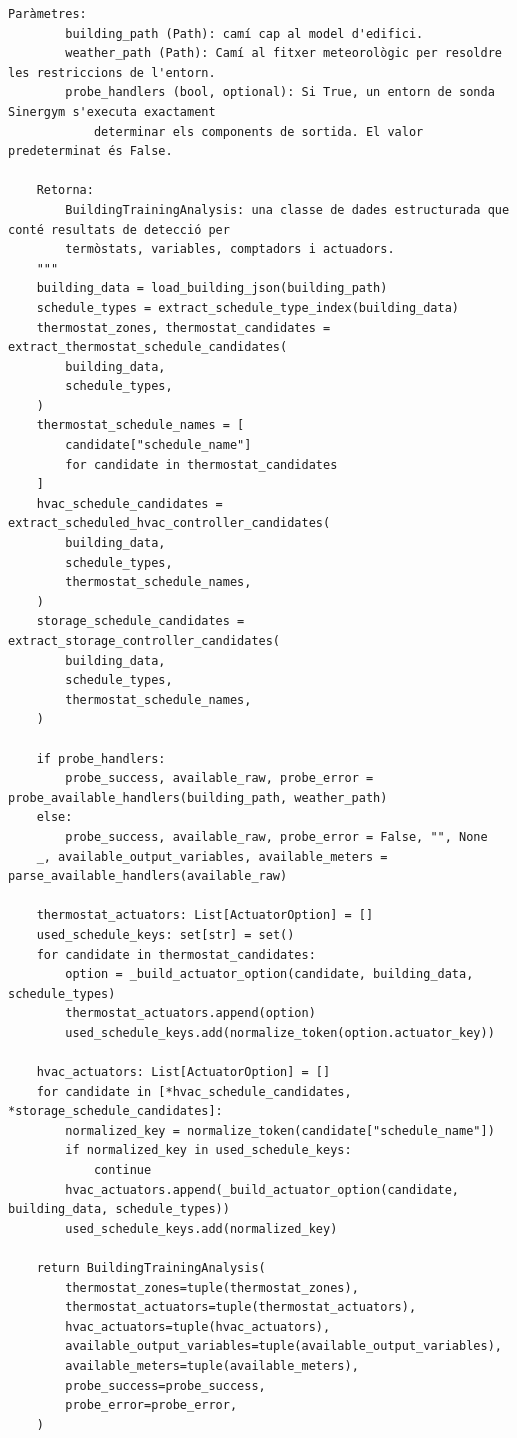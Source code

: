 \documentclass[10pt,a4paper]{article}
\begin{document}
\begin{lstlisting}[style=studioPython,caption={backend/afegir\_entorn\_analysis.py},label={lst:backend-afegir-entorn-analysis-py}]
    Paràmetres:
        building_path (Path): camí cap al model d'edifici.
        weather_path (Path): Camí al fitxer meteorològic per resoldre les restriccions de l'entorn.
        probe_handlers (bool, optional): Si True, un entorn de sonda Sinergym s'executa exactament
            determinar els components de sortida. El valor predeterminat és False.

    Retorna:
        BuildingTrainingAnalysis: una classe de dades estructurada que conté resultats de detecció per
        termòstats, variables, comptadors i actuadors.
    """
    building_data = load_building_json(building_path)
    schedule_types = extract_schedule_type_index(building_data)
    thermostat_zones, thermostat_candidates = extract_thermostat_schedule_candidates(
        building_data,
        schedule_types,
    )
    thermostat_schedule_names = [
        candidate["schedule_name"]
        for candidate in thermostat_candidates
    ]
    hvac_schedule_candidates = extract_scheduled_hvac_controller_candidates(
        building_data,
        schedule_types,
        thermostat_schedule_names,
    )
    storage_schedule_candidates = extract_storage_controller_candidates(
        building_data,
        schedule_types,
        thermostat_schedule_names,
    )

    if probe_handlers:
        probe_success, available_raw, probe_error = probe_available_handlers(building_path, weather_path)
    else:
        probe_success, available_raw, probe_error = False, "", None
    _, available_output_variables, available_meters = parse_available_handlers(available_raw)

    thermostat_actuators: List[ActuatorOption] = []
    used_schedule_keys: set[str] = set()
    for candidate in thermostat_candidates:
        option = _build_actuator_option(candidate, building_data, schedule_types)
        thermostat_actuators.append(option)
        used_schedule_keys.add(normalize_token(option.actuator_key))

    hvac_actuators: List[ActuatorOption] = []
    for candidate in [*hvac_schedule_candidates, *storage_schedule_candidates]:
        normalized_key = normalize_token(candidate["schedule_name"])
        if normalized_key in used_schedule_keys:
            continue
        hvac_actuators.append(_build_actuator_option(candidate, building_data, schedule_types))
        used_schedule_keys.add(normalized_key)

    return BuildingTrainingAnalysis(
        thermostat_zones=tuple(thermostat_zones),
        thermostat_actuators=tuple(thermostat_actuators),
        hvac_actuators=tuple(hvac_actuators),
        available_output_variables=tuple(available_output_variables),
        available_meters=tuple(available_meters),
        probe_success=probe_success,
        probe_error=probe_error,
    )
\end{lstlisting}
\end{document}
